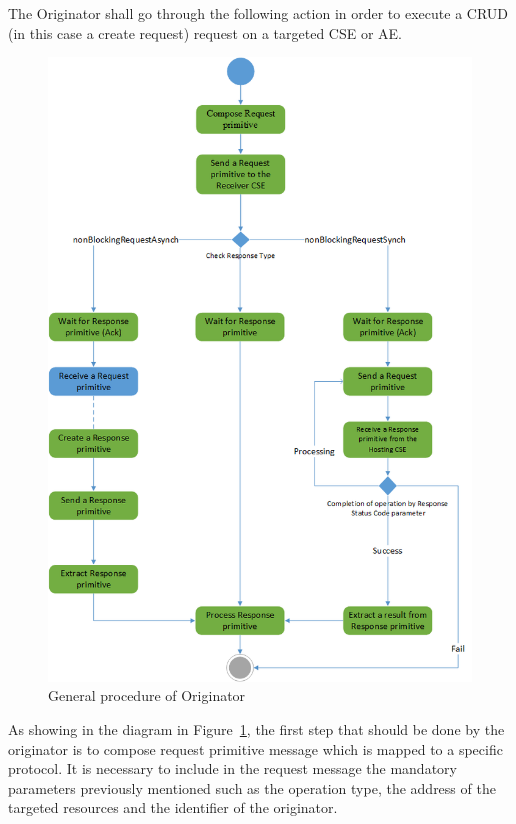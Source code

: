 The Originator shall go through the following action in order to execute a CRUD (in this case a create request) request on a targeted CSE or AE.\par
\begin{figure}[htbp]
    \centering
    \includegraphics[width=1\textwidth]{resources/images/ori}
    \caption{General procedure of Originator }\label{fig:contrib1:dia}
\end{figure}
As showing in the diagram in Figure~\ref{fig:contrib1:dia}, the first step that should be done by the originator is to compose request primitive message which is mapped to a specific protocol. It is necessary to include in the request message the mandatory parameters previously mentioned such as the operation type, the address of the targeted resources and the identifier of the originator.\par
